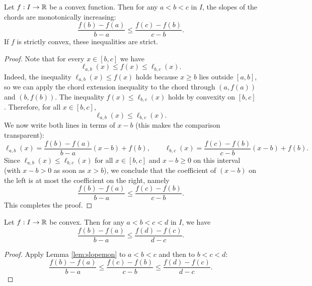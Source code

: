 \documentclass[../analysis1.tex]{subfiles}
\begin{document}
\begin{lemma}
\label{lem:slopemon}
    \begin{shaded*}
        Let $f: I \to \mathbb{R}$ be a convex function. Then for any $a < b < c$ in $I$, the slopes of the chords are monotonically increasing:
        \[ \frac{f(b)-f(a)}{b-a} \le \frac{f(c)-f(b)}{c-b}. \]
        If $f$ is strictly convex, these inequalities are strict.
    \end{shaded*}
\end{lemma}

\begin{proof}
    Note that for every $x \in [b, c]$ we have
\[ \ell_{a,b}(x) \le f(x) \le \ell_{b,c}(x). \]
Indeed, the inequality $\ell_{a,b}(x) \le f(x)$ holds because $x \ge b$ lies outside $[a, b]$, so we can apply the chord extension inequality to the chord through $(a, f(a))$ and $(b, f(b))$. The inequality $f(x) \le \ell_{b,c}(x)$ holds by convexity on $[b, c]$.
Therefore, for all $x \in [b, c]$,
\[ \ell_{a,b}(x) \le \ell_{b,c}(x). \]
We now write both lines in terms of $x - b$ (this makes the comparison transparent):
\[ \ell_{a,b}(x) = \frac{f(b) - f(a)}{b - a}(x - b) + f(b), \qquad \ell_{b,c}(x) = \frac{f(c) - f(b)}{c - b}(x - b) + f(b). \]
Since $\ell_{a,b}(x) \le \ell_{b,c}(x)$ for all $x \in [b, c]$ and $x - b \ge 0$ on this interval (with $x - b > 0$ as soon as $x > b$), we conclude that the coefficient of $(x - b)$ on the left is at most the coefficient on the right, namely
\[ \frac{f(b) - f(a)}{b - a} \le \frac{f(c) - f(b)}{c - b}. \]
This completes the proof. \qedhere
\end{proof}

\begin{corollary}
\label{cor:threechord}
    \begin{shaded*}
        Let $f:I\to\mathbb{R}$ be convex. Then for any $a<b<c<d$ in $I$, we have
        \[\frac{f(b)-f(a)}{b-a}\le \frac{f(d)-f(c)}{d-c}.\] 
    \end{shaded*}
\end{corollary}
\begin{proof}
    Apply Lemma \ref{lem:slopemon} to $a<b<c$ and then to $b<c<d$:
\[ \frac{f(b) - f(a)}{b - a} \le \frac{f(c) - f(b)}{c - b} \le \frac{f(d) - f(c)}{d - c}. \]\qedhere
\end{proof}
\end{document}
